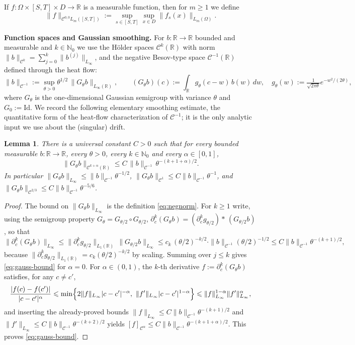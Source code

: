 \documentclass[12pt]{article}
\newtheorem{lemma}[theorem]{Lemma}
\theoremstyle{definition}
\DeclareMathOperator{\1}{\mathbbm{1}}%
\renewcommand{\ge}{\geqslant}
\renewcommand{\le}{\leqslant}
\newcommand{\C}{\mathcal{C}}
\newcommand{\N}{\mathbb{N}}
\newcommand{\R}{\mathbb{R}}
\begin{document}
If $f\colon\Omega\times [S,T]\times D\to\R$ is a measurable function, then for 
$m\ge1$ we define
\begin{equation}\label{fullsnormsde}
\|f\|_{\C^{0,0}L_m([S,T])}:=\sup_{s\in[S,T]}\sup_{x\in D}\|f_s(x)\|_{L_m(\Omega)}.
\end{equation}	


\bigskip
\noindent\textbf{Function spaces and Gaussian smoothing.} 
For $b\colon\R\to\R$ bounded and measurable and $k\in\N_0$ we use the H\"older spaces $\C^k(\R)$
with norm $\|b\|_{\C^k}=\sum_{j=0}^k\|b^{(j)}\|_{L_\infty}$, and the negative
Besov-type space $\C^{-1}(\R)$ defined through the heat flow:
\begin{equation}\label{eq:negnorm}
\|b\|_{\C^{-1}}:=\sup_{\theta>0}\theta^{1/2}\,\|G_\theta b\|_{L_\infty(\R)},
\qquad
(G_\theta b)(c):=\int_\R g_\theta(c-w)\,b(w)\,dw,\quad 
g_\theta(w):=\tfrac1{\sqrt{2\pi\theta}}e^{-w^2/(2\theta)},
\end{equation}
where $G_\theta$ is the one-dimensional Gaussian semigroup with variance $\theta$ and
$G_0:=\mathrm{Id}$. We record the following elementary smoothing estimate, the
quantitative form of the heat-flow characterization of $\C^{-1}$; it is the
only analytic input we use about the (singular) drift.

\begin{lemma}\label{L:smoothing}
There is a universal constant $C>0$ such that for every bounded measurable
$b\colon\R\to\R$, every $\theta>0$, every $k\in\N_0$ and every $\alpha\in[0,1]$,
\begin{equation}\label{eq:gauss-bound}
\|G_\theta b\|_{\C^{k+\alpha}(\R)}\le C\,\|b\|_{\C^{-1}}\,\theta^{-(k+1+\alpha)/2}.
\end{equation}
In particular $\|G_\theta b\|_{L_\infty}\le \|b\|_{\C^{-1}}\theta^{-1/2}$,
$\|G_\theta b\|_{\C^1}\le C\|b\|_{\C^{-1}}\theta^{-1}$, and
$\|G_\theta b\|_{\C^{2/3}}\le C\|b\|_{\C^{-1}}\theta^{-5/6}$.
\end{lemma}
\begin{proof}
The bound on $\|G_\theta b\|_{L_\infty}$ is the definition \eqref{eq:negnorm}. For $k\ge1$
write, using the semigroup property $G_\theta=G_{\theta/2}\circ G_{\theta/2}$,
$\partial_c^k(G_\theta b)=(\partial_c^k g_{\theta/2})*\,(G_{\theta/2}b)$, so that
\[
\|\partial_c^k(G_\theta b)\|_{L_\infty}
\le \|\partial_c^k g_{\theta/2}\|_{L_1(\R)}\,\|G_{\theta/2}b\|_{L_\infty}
\le c_k\,(\theta/2)^{-k/2}\cdot \|b\|_{\C^{-1}}(\theta/2)^{-1/2}
\le C\|b\|_{\C^{-1}}\theta^{-(k+1)/2},
\]
because $\|\partial_c^k g_{\theta/2}\|_{L_1(\R)}=c_k(\theta/2)^{-k/2}$ by scaling. Summing over
$j\le k$ gives \eqref{eq:gauss-bound} for $\alpha=0$. For $\alpha\in(0,1)$, the $k$-th derivative
$f:=\partial_c^k(G_\theta b)$ satisfies, for any $c\ne c'$,
\[
\frac{|f(c)-f(c')|}{|c-c'|^\alpha}
\le \min\Bigl\{2\|f\|_{L_\infty}|c-c'|^{-\alpha},\ \|f'\|_{L_\infty}|c-c'|^{1-\alpha}\Bigr\}
\le \|f\|_{L_\infty}^{1-\alpha}\|f'\|_{L_\infty}^{\alpha},
\]
and inserting the already-proved bounds $\|f\|_{L_\infty}\le C\|b\|_{\C^{-1}}\theta^{-(k+1)/2}$ and
$\|f'\|_{L_\infty}\le C\|b\|_{\C^{-1}}\theta^{-(k+2)/2}$ yields
$[f]_{\C^\alpha}\le C\|b\|_{\C^{-1}}\theta^{-(k+1+\alpha)/2}$. This proves \eqref{eq:gauss-bound}.
\end{proof}
\end{document}
